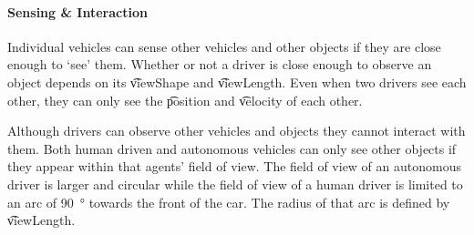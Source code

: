 

\paragraph{Sensing \& Interaction} 
Individual vehicles can sense other vehicles and other objects if they are close enough to `see' them. Whether or not a driver is close enough to observe an object depends on its \t{viewShape} and \t{viewLength}. Even when two drivers see each other, they can only see the \t{position} and \t{velocity} of each other.

Although drivers can observe other vehicles and objects they cannot interact with them. Both human driven and autonomous vehicles can only see other objects if they appear within that agents' field of view. The field of view of an autonomous driver is larger and circular while the field of view of a human driver is limited to an arc of \si{90\degree} towards the front of the car. The radius of that arc is defined by \t{viewLength}.



